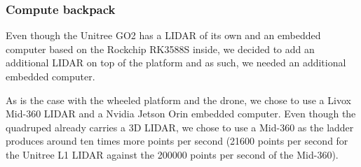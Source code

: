 \documentclass[12pt]{article}
\begin{document}
        \subsubsection{Compute backpack}

        Even though the Unitree GO2 has a LIDAR of its own and an embedded computer based on the Rockchip RK3588S inside, we decided to add an additional LIDAR on top of the platform and as such, we needed an additional embedded computer.

        As is the case with the wheeled platform and the drone, we chose to use a Livox Mid-360 LIDAR and a Nvidia Jetson Orin embedded computer. Even though the quadruped already carries a 3D LIDAR, we chose to use a Mid-360 as the ladder produces around ten times more points per second (21600 points per second for the Unitree L1 LIDAR against the 200000 points per second of the Mid-360).
\end{document}

